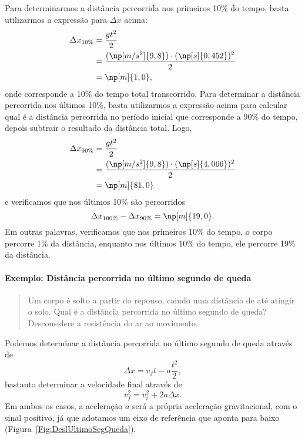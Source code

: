 Para determinarmos a distância percorrida nos primeiros 10\% do tempo, basta utilizarmos a expressão para $\Delta x$ acima:
\begin{align}
	\Delta x_{10\%} &= \frac{gt^2}{2} \\
	&= \frac{(\np[m/s^2]{9,8}) \cdot (\np[s]{0,452})^2}{2} \\
	&= \np[m]{1,0},
\end{align}
%
onde  corresponde a 10\% do tempo total transcorrido. Para determinar a distância percorrida nos últimos 10\%, basta utilizarmos a expressão acima para calcular qual é a distância percorrida no período inicial que corresponde a 90\% do tempo, depois subtrair o resultado da distância total. Logo,
\begin{align}
	\Delta x_{90\%} &= \frac{gt^2}{2} \\
	&= \frac{(\np[m/s^2]{9,8}) \cdot (\np[s]{4,066})^2}{2} \\
	&= \np[m]{81,0}
\end{align}
%
e verificamos que nos últimos 10\% são percorridos
\begin{equation}
	\Delta x_{100\%} - \Delta x_{90\%} = \np[m]{19,0}.
\end{equation}
%
Em outras palavras, verificamos que nos primeiros 10\% do tempo, o corpo percorre 1\% da distância, enquanto nos últimos 10\% do tempo, ele percorre 19\% da distância.

\paragraph{Exemplo: Distância percorrida no último segundo de queda}

\begin{quote}
    Um corpo é solto a partir do repouso, caindo uma distância de  até atingir o solo. Qual é a distância percorrida no último segundo de queda? Desconsidere a resistência do ar ao movimento.
\end{quote}

Podemos determinar a distância percorrida no último segundo de queda através de
\begin{equation}
    \Delta x = v_f t - a\frac{t^2}{2},
\end{equation}
%
bastanto determinar a velocidade final através de
\begin{equation}
    v_f^2 = v_i^2 + 2 a \Delta x.
\end{equation}
%
Em ambos os casos, a aceleração $a$ será a própria aceleração gravitacional, com o sinal positivo, já que adotamos um eixo de referência que aponta para baixo (Figura~\ref{Fig:DeslUltimoSegQueda}).

